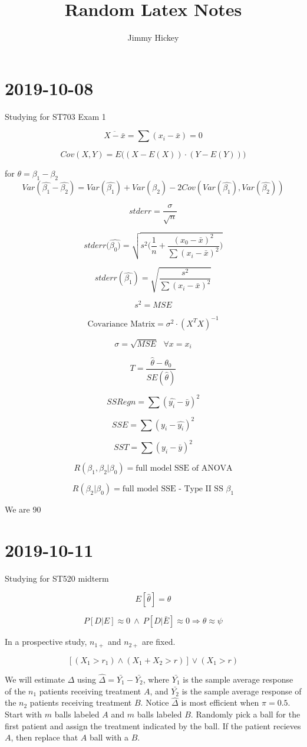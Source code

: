 \documentclass[]{article}
\title{Random Latex Notes}
\author{Jimmy Hickey}
\date{}
\begin{document}
\maketitle

\section*{2019-10-08}
Studying for ST703 Exam 1

$$
\overline{X-\bar{x}} = \sum(x_i - \bar{x}) = 0
$$

$$
Cov(X, Y) = E\Big(  (X - E(X)) \cdot (Y-E(Y)) \Big)
$$

for $\theta = \beta_1 - \beta_2$
$$
Var(\hat{\beta_1}  - \hat{\beta_2}) = Var(\hat{\beta_1}) + Var(\hat{\beta_2}) - 2 Cov( Var(\hat{\beta_1}), Var(\hat{\beta_2}))
$$


$$
stderr = \frac{ \sigma }{ \sqrt{n}  }
$$


$$
stderr(\hat{\beta_0)} = \sqrt{s^2 \Big( \frac{ 1 }{ n } + \frac{ (x_0 - \bar{x})^2 }{ \sum(x_i - \bar{x})^2  } \Big)}
$$

$$
stderr(\hat{\beta_1}) = \sqrt{\frac{ s^2 }{ \sum(x_i - \bar{x})^2 }}
$$


$$
s^2 = MSE
$$

$$
\text{Covariance Matrix} = \sigma^2 \cdot (X^T X)^{-1}
$$

$$
\sigma = \sqrt{MSE} \ \ \ \forall x = x_i
$$

$$
T = \frac{ \hat{\theta} - \theta_0 }{ SE(\hat{\theta}) }
$$


$$
SSRegn = \sum(\hat{y_i} - \bar{y})^2
$$

$$
SSE = \sum(y_i - \hat{y_i})^2
$$


$$
SST = \sum(y_i - \bar{y})^2
$$

$$
R(\beta_1, \beta_2 | \beta_0) = \text{full model SSE of ANOVA}
$$

$$
R(\beta_2 | \beta_0) = \text{full model SSE - Type II SS }  \beta_1
$$

We are 90

\section*{2019-10-11}
Studying for ST520 midterm

$$
E[\hat{\theta}] = \theta
$$

$$
P[D | E] \approx 0 \  \land \ P[D | \bar{E}] \approx 0 \Rightarrow \theta \approx \psi
$$

In a prospective study, $n_{1+}$ and $n_{2+}$ are fixed.

$$
[(X_1 > r_1) \land (X_1 + X_2 > r)] \lor (X_1 > r)
$$

We will estimate $\Delta$ using $\hat{\Delta} = \bar{Y_1} - \bar{Y_2}$, where $\bar{Y_1}$ is the sample average response of the $n_1$ patients receiving treatment $A$, and $\bar{Y_2}$ is the sample average response of the $n_2$ patients receiving treatment $B$. Notice $\hat{\Delta}$ is most efficient when $\pi = 0.5 $. \\

\noindent
Start with $m$ balls labeled $A$ and $m$ balls labeled $B$. Randomly pick a ball for the first patient and assign the treatment indicated by the ball. If the patient recieves $A$, then replace that $A$ ball with a $B$.
\end{document}
